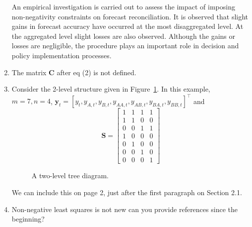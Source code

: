 \documentclass[10pt,a4paper]{article}
\begin{document}
\begin{enumerate}
{	An empirical investigation is carried out to assess the impact of imposing non-negativity constraints on forecast reconciliation. It is observed that slight gains in forecast accuracy have occurred at the most disaggregated level. At the aggregated level slight losses are also observed. Although the gains or losses are negligible, the procedure plays an important role in decision and policy implementation processes.}
\item The matrix $\bm{C}$ after eq (2) is not defined.
\item [] Consider the 2-level structure given in Figure~\ref{fig:hier2}. In this example, $m = 7, n = 4$, $\bm{y}_t = \left[y_t, y_{A, t}, y_{B, t}, y_{AA, t}, y_{AB, t}, y_{BA, t}, y_{BB, t}\right]^\top$ and
$$\bm{S} = \begin{bmatrix}
1 & 1 & 1 & 1\\
1 & 1 & 0 & 0\\
0 & 0 & 1 & 1\\
1 & 0 & 0 & 0\\
0 & 1 & 0 & 0\\
0 & 0 & 1 & 0\\
0 & 0 & 0 & 1
\end{bmatrix}$$
\begin{figure}[!htb]  \center
	\caption{A two-level tree diagram.}
	\label{fig:hier2}
\end{figure}

{\color{red} We can include this on page 2, just after the first paragraph on Section 2.1.}

\item Non-negative least squares is not new can you provide references since the beginning?


\end{enumerate}
\end{document}
